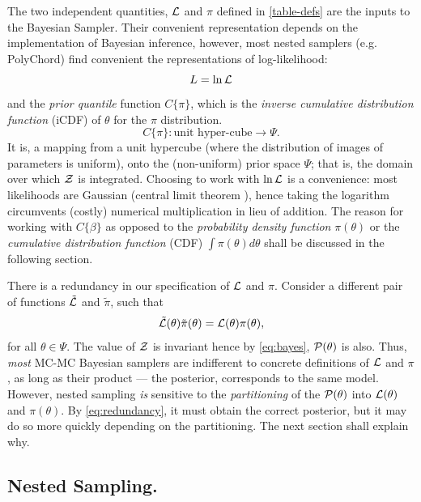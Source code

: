 \documentclass[usenatbib]{mnras}
\begin{document}
The two independent quantities, \({\cal L}\) and \(\pi\) defined in
\autoref{table-defs} are the inputs to the Bayesian Sampler. Their
convenient representation depends on the implementation of Bayesian
inference, however, most nested samplers (e.g. PolyChord) find
convenient the representations of log-likelihood:
\begin{equation}
  L = \ln \cal L
\end{equation}
and the \emph{prior quantile} function \(C\{\pi\}\), which is the \emph{inverse
cumulative distribution function} (iCDF) of \(\theta\) for the
\(\pi\) distribution. 
\begin{equation}
 C\{\pi\} : \text{unit hyper-cube} \rightarrow \Psi.
\end{equation}
It is, a mapping from a unit hypercube (where the distribution of
images of parameters is uniform), onto the (non-uniform) prior
space \(\Psi\); that is, the domain over which \({\cal Z}\) is
integrated. Choosing to work with \(\ln {\cal L}\) is a convenience:
most likelihoods are Gaussian (central limit theorem
\cite{central-limit-theorem}), hence taking the logarithm circumvents
(costly) numerical multiplication in lieu of addition. The reason
for working with \(C\{\beta\}\) as opposed to the \emph{probability density
function} \(\pi(\theta)\) or the \emph{cumulative distribution function} (CDF) \(\int
   \pi(\theta) d\theta\) shall be discussed in the following section.

There is a redundancy in our specification of \({\cal L}\) and \(\pi\). 
Consider a different pair of functions \(\tilde{{\cal L}}\) and
\(\tilde{\pi}\), such that
\begin{equation}\label{eq:redundancy}
  \tilde{\cal L}(\theta) \tilde{\pi}(\theta) = \cal L (\theta) \pi (\theta), 
\end{equation}
for all \(\theta \in \Psi\). The value of \({\cal Z}\) is invariant
hence by \autoref{eq:bayes}, \({\cal P}(\theta)\) is also. Thus, \emph{most}
MC-MC Bayesian samplers are indifferent to concrete definitions of
\(\cal L\) and \(\pi\), as long as their product --- the posterior,
corresponds to the same model. However, nested sampling \emph{is}
sensitive to the \emph{partitioning} of the \({\cal P} (\theta)\) into \({\cal L}(\theta)\)
and \(\pi(\theta)\). By \autoref{eq:redundancy}, it must obtain the correct
posterior, but it may do so more quickly depending on the
partitioning. The next section shall explain why.

\subsection{Nested Sampling.}
\label{sec:org664367f}
\end{document}

